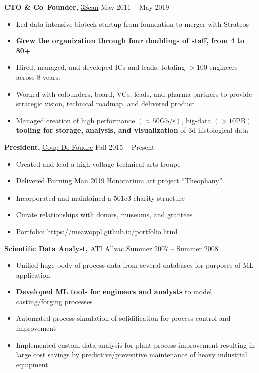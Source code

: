 \documentclass{res}
\begin{document}
\begin{resume}
{\bf CTO \& Co--Founder,} \href{http://www.3scan.com}{3Scan} \hfill
May 2011 -- May 2019
\begin{itemize}  \itemsep -2pt
  \item Led data intensive biotech startup from foundation to merger with Strateos
  \item \textbf{Grew the organization through four doublings of staff, from 4 to 80+}
  \item Hired, managed, and developed ICs and leads, totaling $> 100$ engineers across 8 years.
  \item Worked with cofounders, board, VCs, leads, and pharma partners to provide strategic vision,
    technical roadmap, and delivered product
  \item Managed creation of high performance $(\approx 50 \mathrm{Gb/s})$, big-data $(> 10\mathrm{PB})$ \textbf{tooling for
    storage, analysis, and visualization} of 3d histological data
\end{itemize}

{\bf President,}  \href{http://coupdefoud.re}{Coup De Foudre} \hfill   Fall 2015 -- Present
\begin{itemize} \itemsep -2pt
  \item Created and lead a high-voltage technical arts troupe
  \item Delivered Burning Man 2019 Honorarium art project ``Theophany''
  \item Incorporated and maintained a 501c3 charity structure
  \item Curate relationships with donors, museums, and grantees
  \item Portfolio: \href{https://meawoppl.github.io/portfolio.html}{https://meawoppl.github.io/portfolio.html}
\end{itemize}

{\bf Scientific Data Analyst,} \href{https://www.atimetals.com/}{ATI Allvac} \hfill
Summer 2007 -- Summer 2008
\begin{itemize} \itemsep -2pt
  \item Unified huge body of process data from several databases for purposes of ML application
  \item \textbf{Developed ML tools for engineers and analysts} to model casting/forging processes
  \item Automated process simulation of solidification for process control and improvement
  \item Implemented custom data analysis for plant process improvement resulting in large
        cost savings by predictive/preventive maintenance of heavy industrial equipment
\end{itemize}


\end{resume}
\end{document}
